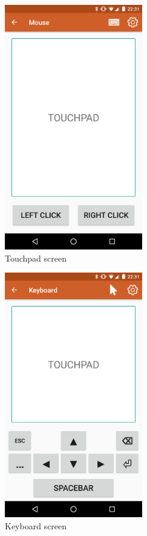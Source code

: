\documentclass{sig-alternate}
\renewcommand\_{\textunderscore\allowbreak}  %
\begin{document}
\begin{figure}[hp]
	\hypertarget{fig:touchpad}{}
	\centering
	\includegraphics[width=6cm]{screenshots/touchpad}
	\caption{Touchpad screen}
\end{figure}

\begin{figure}[hp]
	\hypertarget{fig:keyboard}{}
	\centering
	\includegraphics[width=6cm]{screenshots/keyboard}
	\caption{Keyboard screen}
\end{figure}
\end{document}
